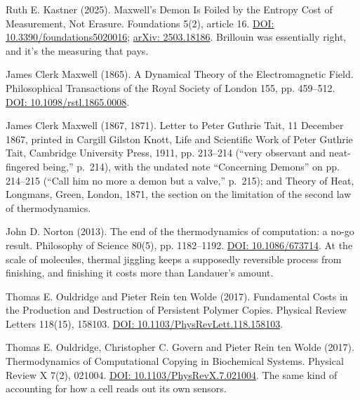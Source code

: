 \documentclass[11pt,twoside]{article}
\theoremstyle{thielethm}
\theoremstyle{thieledef}
\theoremstyle{thieledef}
\theoremstyle{thieledef}
\theoremstyle{thielethm}
\theoremstyle{thieleobs}
\theoremstyle{thielethm}
\begin{document}
\noindent Ruth E. Kastner (2025). Maxwell's Demon Is Foiled by the Entropy Cost of Measurement, Not Erasure. Foundations 5(2), article 16. \href{https://doi.org/10.3390/foundations5020016}{DOI: 10.3390/foundations5020016}; \href{https://arxiv.org/abs/2503.18186}{arXiv: 2503.18186}. Brillouin was essentially right, and it's the measuring that pays.
\par\medskip

\noindent James Clerk Maxwell (1865). A Dynamical Theory of the Electromagnetic Field. Philosophical Transactions of the Royal Society of London 155, pp. 459--512. \href{https://doi.org/10.1098/rstl.1865.0008}{DOI: 10.1098/rstl.1865.0008}.
\par\medskip

\noindent James Clerk Maxwell (1867, 1871). Letter to Peter Guthrie Tait, 11 December 1867, printed in Cargill Gilston Knott, Life and Scientific Work of Peter Guthrie Tait, Cambridge University Press, 1911, pp. 213--214 (``very observant and neat-fingered being,'' p.~214), with the undated note ``Concerning Demons'' on pp. 214--215 (``Call him no more a demon but a valve,'' p.~215); and Theory of Heat, Longmans, Green, London, 1871, the section on the limitation of the second law of thermodynamics.
\par\medskip

\noindent John D. Norton (2013). The end of the thermodynamics of computation: a no-go result. Philosophy of Science 80(5), pp. 1182--1192. \href{https://doi.org/10.1086/673714}{DOI: 10.1086/673714}. At the scale of molecules, thermal jiggling keeps a supposedly reversible process from finishing, and finishing it costs more than Landauer's amount.
\par\medskip

\noindent Thomas E. Ouldridge and Pieter Rein ten Wolde (2017). Fundamental Costs in the Production and Destruction of Persistent Polymer Copies. Physical Review Letters 118(15), 158103. \href{https://doi.org/10.1103/PhysRevLett.118.158103}{DOI: 10.1103/PhysRevLett.118.158103}.
\par\medskip

\noindent Thomas E. Ouldridge, Christopher C. Govern and Pieter Rein ten Wolde (2017). Thermodynamics of Computational Copying in Biochemical Systems. Physical Review X 7(2), 021004. \href{https://doi.org/10.1103/PhysRevX.7.021004}{DOI: 10.1103/PhysRevX.7.021004}. The same kind of accounting for how a cell reads out its own sensors.
\par\medskip
\end{document}
